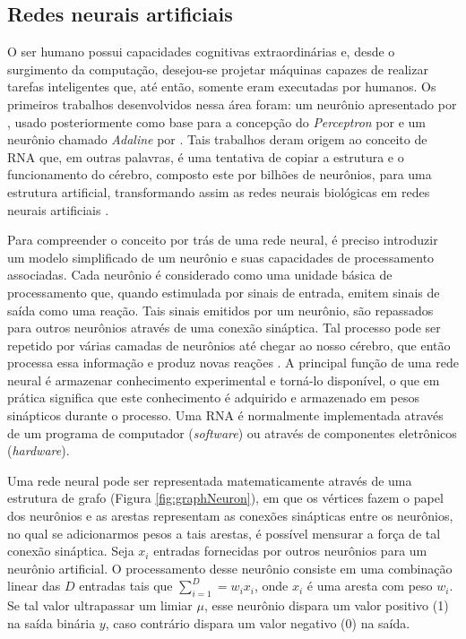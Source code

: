 \subsection{Redes neurais artificiais}
O ser humano possui capacidades cognitivas extraordinárias e, desde o surgimento da computação, desejou-se projetar máquinas capazes de realizar tarefas inteligentes que, até então, somente eram  executadas por humanos. Os primeiros trabalhos desenvolvidos nessa área foram: um neurônio apresentado por \cite{mcculloch1943logical}, usado posteriormente como base para a concepção do  \textit{Perceptron} por \cite{rosenblatt1958perceptron} e um neurônio chamado \textit{Adaline} por \cite{widrow1960adaptive}. Tais trabalhos deram origem ao conceito de RNA que, em outras palavras, é uma tentativa de copiar a estrutura e o funcionamento do cérebro, composto este por bilhões de neurônios, para uma estrutura artificial, transformando assim as redes neurais biológicas em redes neurais artificiais \citep{Rauber2005}.

Para compreender o conceito por trás de uma rede neural, é preciso introduzir um modelo simplificado de um neurônio e suas capacidades de processamento associadas. Cada neurônio é considerado como uma unidade básica de processamento que, quando estimulada por sinais de entrada, emitem sinais de saída como uma reação. Tais sinais emitidos por um neurônio, são repassados para outros neurônios através de uma conexão sináptica. Tal processo pode ser repetido por várias camadas de neurônios até chegar ao nosso cérebro, que então processa essa informação e produz novas reações \citep{baeza1999modern}. A principal função de uma rede neural é armazenar conhecimento experimental e torná-lo disponível, o que em prática significa que este conhecimento é adquirido e armazenado em pesos sinápticos durante o processo. Uma RNA é normalmente implementada através de um programa de computador (\textit{software}) ou através de componentes eletrônicos (\textit{hardware}).

 Uma rede neural pode ser representada matematicamente através de uma estrutura de grafo (Figura \ref{fig:graphNeuron}), em que os vértices fazem o papel dos neurônios e as arestas representam as conexões sinápticas entre os neurônios, no qual se adicionarmos pesos a tais arestas, é possível mensurar a força de tal conexão sináptica. Seja $x_i$ entradas fornecidas por outros neurônios para um neurônio artificial. O processamento desse neurônio consiste em uma combinação linear das $D$ entradas tais que $\sum_{i=1}^{D} = w_i x_i$, onde $x_i$ é uma aresta com peso $w_i$. Se tal valor ultrapassar um limiar $\mu$, esse neurônio dispara um valor positivo (1) na saída binária $y$, caso contrário dispara um valor negativo (0) na saída. 
 
